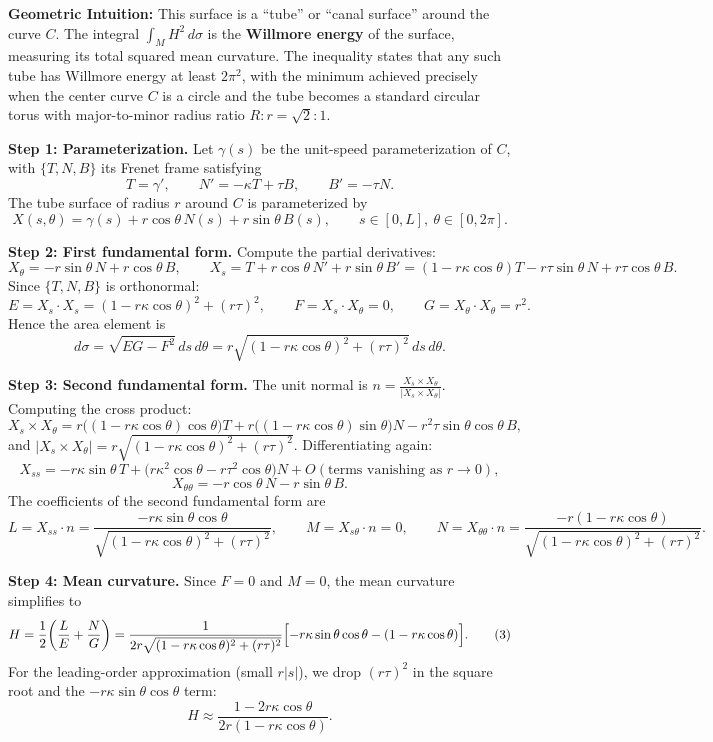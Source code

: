 \begin{solution}
\textbf{Geometric Intuition:} This surface is a ``tube'' or ``canal surface'' around the curve $C$. The integral $\int_M H^2\,d\sigma$ is the \textbf{Willmore energy} of the surface, measuring its total squared mean curvature. The inequality states that any such tube has Willmore energy at least $2\pi^2$, with the minimum achieved precisely when the center curve $C$ is a circle and the tube becomes a standard circular torus with major-to-minor radius ratio $R : r = \sqrt{2} : 1$.

\textbf{Step 1: Parameterization.}
Let $\gamma(s)$ be the unit-speed parameterization of $C$, with $\{T, N, B\}$ its Frenet frame satisfying
\[
T = \gamma',\qquad N' = -\kappa T + \tau B,\qquad B' = -\tau N.
\]
The tube surface of radius $r$ around $C$ is parameterized by
\[
X(s, \theta) = \gamma(s) + r\cos\theta\, N(s) + r\sin\theta\, B(s),\qquad s\in[0,L],\ \theta\in[0,2\pi].
\]

\textbf{Step 2: First fundamental form.}
Compute the partial derivatives:
\[
X_\theta = -r\sin\theta\, N + r\cos\theta\, B,\qquad
X_s = T + r\cos\theta\, N' + r\sin\theta\, B' = (1-r\kappa\cos\theta)T - r\tau\sin\theta\, N + r\tau\cos\theta\, B.
\]
Since $\{T,N,B\}$ is orthonormal:
\[
E = X_s\cdot X_s = (1-r\kappa\cos\theta)^2 + (r\tau)^2,\qquad
F = X_s\cdot X_\theta = 0,\qquad
G = X_\theta\cdot X_\theta = r^2.
\]
Hence the area element is
\[
d\sigma = \sqrt{EG-F^2}\,ds\,d\theta = r\sqrt{(1-r\kappa\cos\theta)^2+(r\tau)^2}\,ds\,d\theta.
\tag{1}
\]

\textbf{Step 3: Second fundamental form.}
The unit normal is $n = \frac{X_s\times X_\theta}{|X_s\times X_\theta|}$.  Computing the cross product:
\[
X_s\times X_\theta = r\bigl((1-r\kappa\cos\theta)\cos\theta\bigr)T
+ r\bigl((1-r\kappa\cos\theta)\sin\theta\bigr)N
- r^2\tau\sin\theta\cos\theta\,B,
\]
and $|X_s\times X_\theta| = r\sqrt{(1-r\kappa\cos\theta)^2+(r\tau)^2}$.  Differentiating again:
\[
X_{ss} = -r\kappa\sin\theta\,T + \bigl(r\kappa^2\cos\theta-r\tau^2\cos\theta\bigr)N + O(\text{terms vanishing as }r\to0),
\]
\[
X_{\theta\theta} = -r\cos\theta\,N - r\sin\theta\,B.
\]
The coefficients of the second fundamental form are
\[
L = X_{ss}\cdot n = \frac{-r\kappa\sin\theta\cos\theta}{\sqrt{(1-r\kappa\cos\theta)^2+(r\tau)^2}},\qquad
M = X_{s\theta}\cdot n = 0,\qquad
N = X_{\theta\theta}\cdot n = \frac{-r(1-r\kappa\cos\theta)}{\sqrt{(1-r\kappa\cos\theta)^2+(r\tau)^2}}.
\tag{2}
\]

\textbf{Step 4: Mean curvature.}
Since $F=0$ and $M=0$, the mean curvature simplifies to
\[
H = \frac{1}{2}\!\left(\frac{L}{E}+\frac{N}{G}\right)
= \frac{1}{2r\sqrt{(1-r\kappa\cos\theta)^2+(r\tau)^2}}
\Bigl[-r\kappa\sin\theta\cos\theta -(1-r\kappa\cos\theta)\Bigr].
\tag{3}
\]
For the leading-order approximation (small $r|s|$), we drop $(r\tau)^2$ in the square root and the $-r\kappa\sin\theta\cos\theta$ term:
\[
H \approx \frac{1-2r\kappa\cos\theta}{2r(1-r\kappa\cos\theta)}.
\tag{4}
\]


\end{solution}
